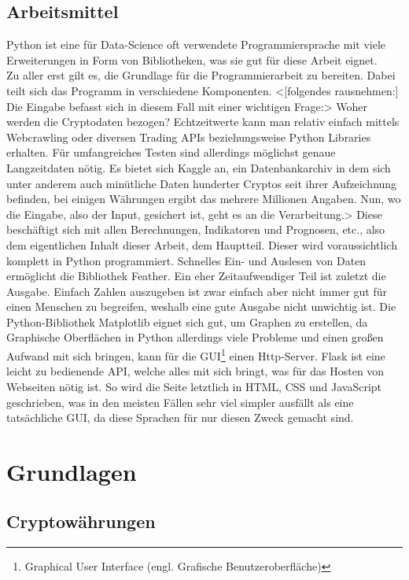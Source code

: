 \documentclass[12pt]{article}
\begin{document}
\subsection{Arbeitsmittel}
	Python ist eine für Data-Science oft verwendete Programmiersprache mit viele Erweiterungen in Form von Bibliotheken, was sie gut für diese Arbeit eignet. \\
	Zu aller erst gilt es, die Grundlage für die Programmierarbeit zu bereiten. Dabei teilt sich das Programm in verschiedene Komponenten. <[folgendes rausnehmen:] Die Eingabe befasst sich in diesem Fall mit einer wichtigen Frage:> Woher werden die Cryptodaten bezogen? Echtzeitwerte kann man relativ einfach mittels Webcrawling oder diversen Trading APIs beziehungsweise Python Libraries erhalten. Für umfangreiches Testen sind allerdings möglichst genaue Langzeitdaten nötig. Es bietet sich Kaggle an, ein Datenbankarchiv in dem sich unter anderem auch minütliche Daten hunderter Cryptos seit ihrer Aufzeichnung befinden, bei einigen Währungen ergibt das mehrere Millionen Angaben.
 	Nun, wo die Eingabe, also der Input, gesichert ist, geht es an die Verarbeitung.> Diese beschäftigt sich mit allen Berechnungen, Indikatoren und Prognosen, etc., also dem eigentlichen Inhalt dieser Arbeit, dem Hauptteil. Dieser wird voraussichtlich komplett in Python programmiert. Schnelles Ein- und Auslesen von Daten ermöglicht die Bibliothek \glqq Feather\grqq{}. 
	Ein eher Zeitaufwendiger Teil ist zuletzt die Ausgabe. Einfach Zahlen auszugeben ist zwar einfach aber nicht immer gut für einen Menschen zu begreifen, weshalb eine gute Ausgabe nicht unwichtig ist. Die Python-Bibliothek Matplotlib eignet sich gut, um Graphen zu erstellen, da Graphische Oberflächen in Python allerdings viele Probleme und einen großen Aufwand mit sich bringen, kann für die GUI\footnote{Graphical User Interface (engl. Grafische Benutzeroberfläche)} einen Http-Server. Flask ist eine leicht zu bedienende API, welche alles mit sich bringt, was für das Hosten von Webseiten nötig ist. So wird die Seite letztlich in HTML, CSS und JavaScript geschrieben, was in den meisten Fällen sehr viel simpler ausfällt als eine tatsächliche GUI, da diese Sprachen für nur diesen Zweck gemacht sind.

\section{Grundlagen}
\subsection{Cryptowährungen}
\end{document}
